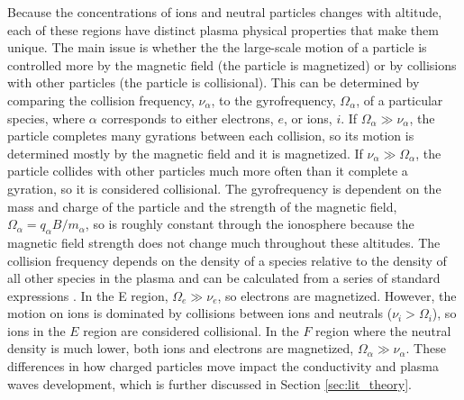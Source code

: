 Because the concentrations of ions and neutral particles changes with altitude, each of these regions have distinct plasma physical properties that make them unique.  The main issue is whether the the large-scale motion of a particle is controlled more by the magnetic field (the particle is magnetized) or by collisions with other particles (the particle is collisional).  This can be determined by comparing the collision frequency, \(\nu_\alpha\), to the gyrofrequency, \(\Omega_\alpha\), of a particular species, where \(\alpha\) corresponds to either electrons, \(e\), or ions, \(i\).  If \(\Omega_\alpha \gg \nu_\alpha\), the particle completes many gyrations between each collision, so its motion is determined mostly by the magnetic field and it is magnetized.  If \(\nu_\alpha \gg \Omega_\alpha\), the particle collides with other particles much more often than it complete a gyration, so it is considered collisional.  The gyrofrequency is dependent on the mass and charge of the particle and the strength of the magnetic field, \(\Omega_\alpha = q_\alpha B/m_\alpha\), so is roughly constant through the ionosphere because the magnetic field strength does not change much throughout these altitudes.  The collision frequency depends on the density of a species relative to the density of all other species in the plasma and can be calculated from a series of standard expressions \citep{Schunk1980,Schunk2009}.  In the E region, \(\Omega_e \gg \nu_e\), so electrons are magnetized.  However, the motion on ions is dominated by collisions between ions and neutrals (\(\nu_i > \Omega_i\)), so ions in the \(E\) region are considered collisional.  In the \(F\) region where the neutral density is much lower, both ions and electrons are magnetized, \(\Omega_\alpha \gg \nu_\alpha\).  These differences in how charged particles move impact the conductivity and plasma waves development, which is further discussed in Section \ref{sec:lit_theory}.

